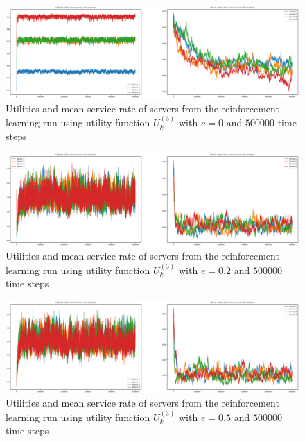 \begin{figure}[H]
    \includegraphics[width=\textwidth]{chapters/00_appendix/03_more_rl_results/Bin/utility_3_eps/u3_2_e0.eps}
    \caption{Utilities and mean service rate of servers from the reinforcement
    learning run using utility function \(U_k^{(3)}\) with \(e = 0\) and
    \(500000\) time steps}
    \label{fig:RL_utility3_2_e0}
\end{figure}

\begin{figure}[H]
    \includegraphics[width=\textwidth]{chapters/00_appendix/03_more_rl_results/Bin/utility_3_eps/u3_2_e02.eps}
    \caption{Utilities and mean service rate of servers from the reinforcement
    learning run using utility function \(U_k^{(3)}\) with \(e = 0.2\) and
    \(500000\) time steps}
    \label{fig:RL_utility3_2_e02}
\end{figure}

\begin{figure}[H]
    \includegraphics[width=\textwidth]{chapters/00_appendix/03_more_rl_results/Bin/utility_3_eps/u3_2_e05.eps}
    \caption{Utilities and mean service rate of servers from the reinforcement
    learning run using utility function \(U_k^{(3)}\) with \(e = 0.5\) and
    \(500000\) time steps}
    \label{fig:RL_utility3_2_e05}
\end{figure}

